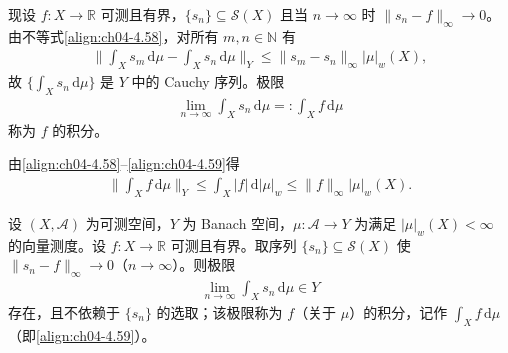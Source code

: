 \documentclass[../../main.tex]{subfiles}%
\begin{document}
现设 $f:X\to\mathbb{R}$ 可测且有界，$\{s_n\}\subseteq\mathcal{S}(X)$ 且当 $n\to\infty$ 时 $\|s_n-f\|_\infty\to0$。由不等式\eqref{align:ch04-4.58}，对所有 $m,n\in\mathbb{N}$ 有
\begin{align*}
\Big\|\int_X s_m\,\mathrm{d}\mu-\int_X s_n\,\mathrm{d}\mu\Big\|_Y\leqslant\|s_m-s_n\|_\infty|\mu|_w(X),
\end{align*}
故 $\{\int_X s_n\,\mathrm{d}\mu\}$ 是 $Y$ 中的 Cauchy 序列。极限
\begin{align}
\lim_{n\to\infty}\int_X s_n\,\mathrm{d}\mu=:\int_X f\,\mathrm{d}\mu \label{align:ch04-4.59}
\end{align}
称为 $f$ 的积分。

由\eqref{align:ch04-4.58}--\eqref{align:ch04-4.59}得
\begin{align}
\Big\|\int_X f\,\mathrm{d}\mu\Big\|_Y\leqslant\int_X|f|\,\mathrm{d}|\mu|_w\leqslant\|f\|_\infty|\mu|_w(X). \label{align:ch04-4.60}
\end{align}

\begin{definition}\label{definition:ch04-有界函数向量测度积分}
设 $(X,\mathcal{A})$ 为可测空间，$Y$ 为 Banach 空间，$\mu:\mathcal{A}\to Y$ 为满足 $|\mu|_w(X)<\infty$ 的向量测度。设 $f:X\to\mathbb{R}$ 可测且有界。取序列 $\{s_n\}\subseteq\mathcal{S}(X)$ 使 $\|s_n-f\|_\infty\to0$（$n\to\infty$）。则极限
\begin{align*}
\lim_{n\to\infty}\int_X s_n\,\mathrm{d}\mu\in Y
\end{align*}
存在，且不依赖于 $\{s_n\}$ 的选取；该极限称为 $f$（关于 $\mu$）的积分，记作 $\int_X f\,\mathrm{d}\mu$（即\eqref{align:ch04-4.59}）。
\end{definition}
\end{document}
